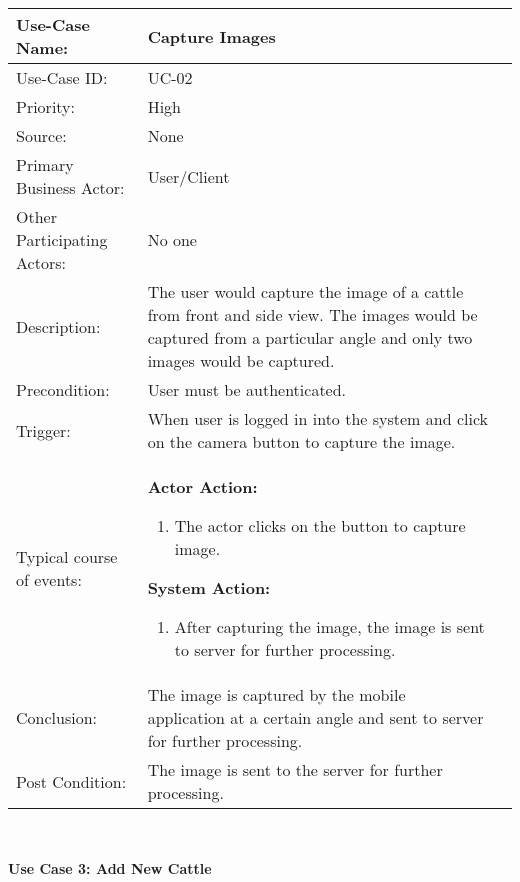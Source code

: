 \begin{tabular}{|l|p{}|p{}|}
	\hline
	Use-Case Name: & Capture Images\\ \hline
	Use-Case ID:& UC-02 \\\hline
	Priority:& High\\ \hline
	Source:& None \\ \hline
	Primary Business Actor: & User/Client\\ \hline
	Other Participating Actors:&  No one\\ \hline
	Description:&  The user would capture the image of a cattle from front and side view. The images would be captured from a particular angle and only two images would be captured. \\ \hline
	Precondition:&  User must be authenticated. \\ \hline
	Trigger:&  When user is logged in into the system and click on the camera button to capture the image.  \\ \hline 
	Typical course of events:&  \textbf{Actor Action:}
	\begin{enumerate}
		\item The actor clicks on the button to capture image. 
		
	\end{enumerate}
	\vspace{2mm}
	
	\textbf{System Action: }
	\begin{enumerate}
		\item	After capturing the image, the image is sent to server for further processing.  
		
	\end{enumerate}
	\\ \hline
	Conclusion:  & The image is captured by the mobile application at a certain angle and sent to server for further processing. \\ \hline
	Post Condition: & The image is sent to the server  for further processing.  \\ \hline
\end{tabular}\\


\pagebreak

\textbf{Use Case 3: Add New Cattle}\\


